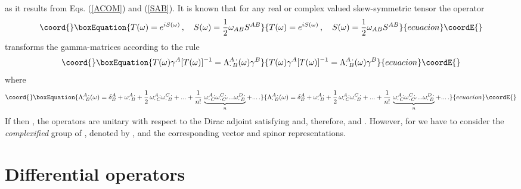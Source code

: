 \documentclass[a4paper,12pt]{article}
\begin{document}
as it results from Eqs. (\ref{ACOM}) and (\ref{SAB}). It is known that for any 
real or complex valued skew-symmetric tensor \coordHE{} 
the operator 
\begin{equation}\coord{}\boxEquation{\label{TeS}
T(\omega)=e^{iS(\omega)}\,,\quad S(\omega)=\frac{1}{2}
\omega_{AB} S^{AB}
}{T(\omega)=e^{iS(\omega)}\,,\quad S(\omega)=\frac{1}{2}
\omega_{AB} S^{AB}
}{ecuacion}\coordE{}\end{equation}
transforms the gamma-matrices according to the rule
\begin{equation}\coord{}\boxEquation{\label{TgT}
T(\omega)\gamma^{A}[T(\omega)]^{-1}=\Lambda^{A\,\cdot}
_{\cdot\,B}(\omega)\gamma^{B} 
}{T(\omega)\gamma^{A}[T(\omega)]^{-1}=\Lambda^{A\,\cdot}
_{\cdot\,B}(\omega)\gamma^{B} 
}{ecuacion}\coordE{}\end{equation}
where
\begin{equation}\coord{}\boxEquation{\label{Lam}
\Lambda^{A\,\cdot}_{\cdot\,B}(\omega)=
\delta^{A}_{B}
+\omega^{A\,\cdot}_{\cdot\,B}
+\frac{1}{2}\,\omega^{A\,\cdot}_{\cdot\,C}
\omega^{C\,\cdot}_{\cdot\,B}+...
+\frac{1}{n!}\,\underbrace{\omega^{A\,\cdot}_{\cdot\,C}
\omega^{C\,\cdot}_{\cdot\, C'}
...\omega^{D\,\cdot}_{\cdot\,B}}_{n}+...\,.
}{\Lambda^{A\,\cdot}_{\cdot\,B}(\omega)=
\delta^{A}_{B}
+\omega^{A\,\cdot}_{\cdot\,B}
+\frac{1}{2}\,\omega^{A\,\cdot}_{\cdot\,C}
\omega^{C\,\cdot}_{\cdot\,B}+...
+\frac{1}{n!}\,\underbrace{\omega^{A\,\cdot}_{\cdot\,C}
\omega^{C\,\cdot}_{\cdot\, C'}
...\omega^{D\,\cdot}_{\cdot\,B}}_{n}+...\,.
}{ecuacion}\coordE{}\end{equation}
If \coordHE{} then \coordHE{},  the 
operators \coordHE{} are unitary with respect to the Dirac adjoint 
satisfying \coordHE{} and, therefore, \coordHE{}
and \coordHE{}. However, 
for \coordHE{} we have to consider the {\em complexified}  
group of \coordHE{}, denoted by \coordHE{}, and the corresponding vector 
and spinor representations.     

\section{Differential operators}
\end{document}
